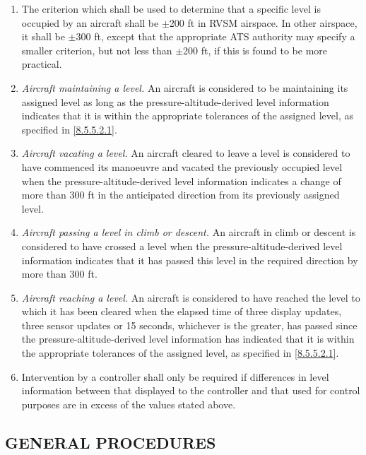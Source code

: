 \begin{enumeratesc}
    \begin{enumerate}
        \item \label{8.5.5.2.1} The criterion which shall be used to determine that a specific level is occupied by an aircraft shall be $\pm$200 ft in RVSM airspace. In other airspace, it shall be $\pm$300 ft, except that the appropriate ATS authority may specify a smaller criterion, but not less than $\pm$200 ft, if this is found to be more practical.
        \item \textit{Aircraft maintaining a level.} An aircraft is considered to be maintaining its assigned level as long as the pressure-altitude-derived level information indicates that it is within the appropriate tolerances of the assigned level, as specified in \ref{8.5.5.2.1}.
        \item \textit{Aircraft vacating a level.} An aircraft cleared to leave a level is considered to have commenced its manoeuvre and vacated the previously occupied level when the pressure-altitude-derived level information indicates a change of more than 300 ft in the anticipated direction from its previously assigned level.
        \item \textit{Aircraft passing a level in climb or descent.} An aircraft in climb or descent is considered to have crossed a level when the pressure-altitude-derived level information indicates that it has passed this level in the required direction by more than 300 ft.
        \item \textit{Aircraft reaching a level.} An aircraft is considered to have reached the level to which it has been cleared when the elapsed time of three display updates, three sensor updates or 15 seconds, whichever is the greater, has passed since the pressure-altitude-derived level information has indicated that it is within the appropriate tolerances of the assigned level, as specified in \ref{8.5.5.2.1}.
        \item Intervention by a controller shall only be required if differences in level information between that displayed to the controller and that used for control purposes are in excess of the values stated above.
    \end{enumerate}
\end{enumeratesc}

\subsection[General procedures]{GENERAL PROCEDURES}

